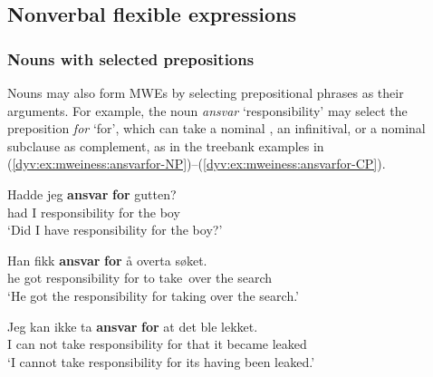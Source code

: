 \documentclass[output=paper]{langsci/langscibook}
\begin{document}
\subsection{Nonverbal flexible expressions}\label{dyv:sec:mweiness:nonverbal}

\subsubsection{Nouns with selected prepositions}\label{dyv:sec:mweiness:prepnoun}

Nouns may also form MWEs by selecting prepositional phrases as their arguments.
For example, the noun \textit{ansvar} `responsibility' may select the preposition \textit{for} `for', which can take a nominal , an infinitival, or a nominal subclause as complement, as in the treebank examples in (\ref{dyv:ex:mweiness:ansvarfor-NP})–(\ref{dyv:ex:mweiness:ansvarfor-CP}).

\ea\label{dyv:ex:mweiness:ansvarfor-NP}
\gll Hadde jeg \textbf{ansvar} \textbf{for} gutten? \\
     had I responsibility for {the boy}\\
\glt `Did I have responsibility for the boy?'
\z


\ea\label{dyv:ex:mweiness:ansvarfor-inf}
\gll Han fikk \textbf{ansvar} \textbf{for} å overta søket. \\
     he got responsibility for to take over {the search}\\
\glt `He got the responsibility for taking over the search.'
\z


\ea\label{dyv:ex:mweiness:ansvarfor-CP}
\gll Jeg kan ikke ta \textbf{ansvar} \textbf{for} at det ble lekket. \\
    I can not take responsibility for that it became leaked\\
\glt `I cannot take responsibility for its having been leaked.'
\z
\end{document}
